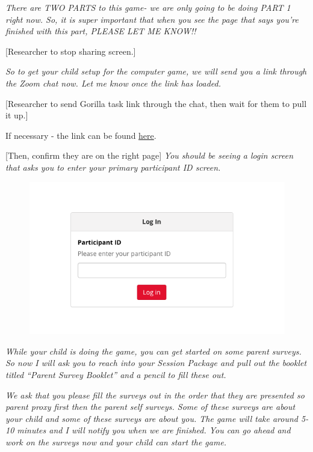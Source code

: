 \documentclass[]{book}
\begin{document}
\emph{There are TWO PARTS to this game- we are only going to be doing PART 1 right now. So, it is super important that when you see the page that says you're finished with this part, PLEASE LET ME KNOW!!}

{[}Researcher to stop sharing screen.{]}

\emph{So to get your child setup for the computer game, we will send you a link through the Zoom chat now. Let me know once the link has loaded.}

{[}Researcher to send Gorilla task link through the chat, then wait for them to pull it up.{]}

If necessary - the link can be found \href{https://research.sc/participant/login/20451/publicid}{here}.

{[}Then, confirm they are on the right page{]} \emph{You should be seeing a login screen that asks you to enter your primary participant ID screen.}

\begin{figure}
\centering
\includegraphics{images/halloween/7.png}
\caption{}
\end{figure}

\emph{While your child is doing the game, you can get started on some parent surveys. So now I will ask you to reach into your Session Package and pull out the booklet titled ``Parent Survey Booklet'' and a pencil to fill these out.}

\emph{We ask that you please fill the surveys out in the order that they are presented so parent proxy first then the parent self surveys. Some of these surveys are about your child and some of these surveys are about you. The game will take around 5-10 minutes and I will notify you when we are finished. You can go ahead and work on the surveys now and your child can start the game.}
\end{document}
